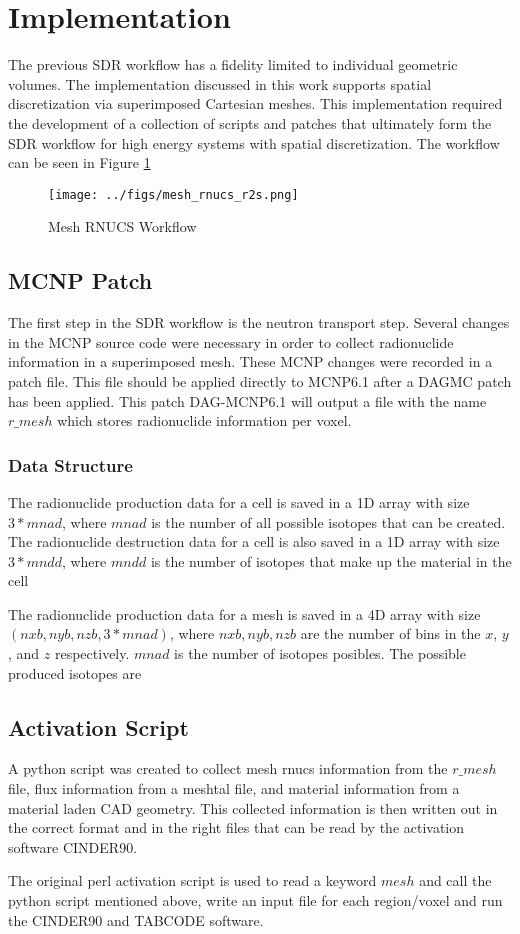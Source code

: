 \section{Implementation}
The previous SDR workflow has a fidelity limited to individual
geometric volumes. The implementation discussed in this work
supports spatial discretization via superimposed Cartesian meshes. 
This implementation required the 
development of a collection of scripts and patches that 
ultimately form the SDR workflow for high energy systems 
with spatial discretization. The workflow can be seen in Figure
\ref{mesh_rnucs}

\begin{figure}[ht]
\begin{centering}
\texttt{[image: ../figs/mesh\_rnucs\_r2s.png]}
\caption{Mesh RNUCS Workflow}
\label{mesh_rnucs}
\end{centering}
\end{figure}


\subsection{MCNP Patch}
The first step in the SDR  workflow is the neutron transport step.
Several changes in the MCNP source code were necessary in order to 
collect radionuclide information in a superimposed mesh.
These MCNP changes were recorded in a patch file. This file should be applied 
directly to MCNP6.1 after a DAGMC patch has been applied.
This patch DAG-MCNP6.1 will output a file with the name $r\_mesh$ which stores 
radionuclide information per voxel.
\subsubsection{Data Structure}
The radionuclide production data for a cell is saved in a 1D array with
size $3*mnad$, where $mnad$ is the number of all possible isotopes
that can be created.
The radionuclide destruction data for a cell is also saved in a 1D array
with size $3*mndd$, where $mndd$ is the number of isotopes that make up
the material in the cell

The radionuclide production data for a mesh is saved in a 4D array
with size $(nxb, nyb,nzb, 3*mnad)$, where $nxb, nyb, nzb$ are the
number of bins in the $x$, $y$, and $z$ respectively. $mnad$ is the
number of isotopes posibles.
The possible produced isotopes are

\subsection{Activation Script}
A python script was created to collect mesh rnucs information from the $r\_mesh$
file, flux information from a meshtal file, and material information from a 
material laden CAD geometry. This collected information is then written out 
in the correct format and in the right files that can be read by the activation 
software CINDER90. 

The original perl activation script is used to read a keyword $mesh$ and call the 
python script mentioned above, write an input file for each region/voxel and run 
the CINDER90 and TABCODE software. 

\newpage
